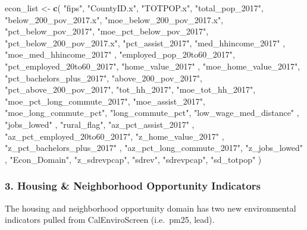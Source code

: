 \documentclass[]{article}
\newenvironment{Shaded}{\begin{snugshade}}{\end{snugshade}}
\newcommand{\KeywordTok}[1]{\textcolor[rgb]{0.13,0.29,0.53}{\textbf{#1}}}
\newcommand{\StringTok}[1]{\textcolor[rgb]{0.31,0.60,0.02}{#1}}
\newcommand{\NormalTok}[1]{#1}
\begin{document}
\begin{Shaded}
\begin{Highlighting}[]
\NormalTok{econ_list <-}\StringTok{ }\KeywordTok{c}\NormalTok{(}
  \StringTok{"fips"}\NormalTok{,}
  \StringTok{"CountyID.x"}\NormalTok{,}
  \StringTok{"TOTPOP.x"}\NormalTok{,}
  \StringTok{"total_pop_2017"}\NormalTok{,}
  \StringTok{"below_200_pov_2017.x"}\NormalTok{,}
  \StringTok{"moe_below_200_pov_2017.x"}\NormalTok{,}
  \StringTok{"pct_below_pov_2017"}\NormalTok{,}
  \StringTok{"moe_pct_below_pov_2017"}\NormalTok{,}
  \StringTok{"pct_below_200_pov_2017.x"}\NormalTok{,}
  \StringTok{"pct_assist_2017"}\NormalTok{,}
  \StringTok{"med_hhincome_2017"}\NormalTok{ ,}
  \StringTok{"moe_med_hhincome_2017"}\NormalTok{ ,}
  \StringTok{"employed_pop_20to60_2017"}\NormalTok{,}
  \StringTok{"pct_employed_20to60_2017"}\NormalTok{,}
  \StringTok{"home_value_2017"}\NormalTok{ ,}
  \StringTok{"moe_home_value_2017"}\NormalTok{,}
  \StringTok{"pct_bachelors_plus_2017"}\NormalTok{,}
  \StringTok{"above_200_pov_2017"}\NormalTok{,}
  \StringTok{"pct_above_200_pov_2017"}\NormalTok{,}
  \StringTok{"tot_hh_2017"}\NormalTok{,}
  \StringTok{"moe_tot_hh_2017"}\NormalTok{,}
  \StringTok{"moe_pct_long_commute_2017"}\NormalTok{,}
  \StringTok{"moe_assist_2017"}\NormalTok{,}
  \StringTok{"moe_long_commute_pct"}\NormalTok{,}
  \StringTok{"long_commute_pct"}\NormalTok{,}
  \StringTok{"low_wage_med_distance"}\NormalTok{ ,}
  \StringTok{"jobs_lowed"}\NormalTok{ ,}
  \StringTok{"rural_flag"}\NormalTok{,}
  \StringTok{"az_pct_assist_2017"}\NormalTok{ ,}
  \StringTok{"az_pct_employed_20to60_2017"}\NormalTok{,}
  \StringTok{"z_home_value_2017"}\NormalTok{ ,}
  \StringTok{"z_pct_bachelors_plus_2017"}\NormalTok{ ,}
  \StringTok{"az_pct_long_commute_2017"}\NormalTok{,}
  \StringTok{"z_jobs_lowed"}\NormalTok{ ,}
  \StringTok{"Econ_Domain"}\NormalTok{,}
  \StringTok{"z_sdrevpcap"}\NormalTok{,}
  \StringTok{"sdrev"}\NormalTok{,}
  \StringTok{"sdrevpcap"}\NormalTok{,}
  \StringTok{"sd_totpop"}
\NormalTok{  )}
\end{Highlighting}
\end{Shaded}

\subsubsection{3. Housing \& Neighborhood Opportunity
Indicators}\label{housing-neighborhood-opportunity-indicators}

The housing and neighborhood opportunity domain has two new
environmental indicators pulled from CalEnviroScreen (i.e.~pm25, lead).
\end{document}
